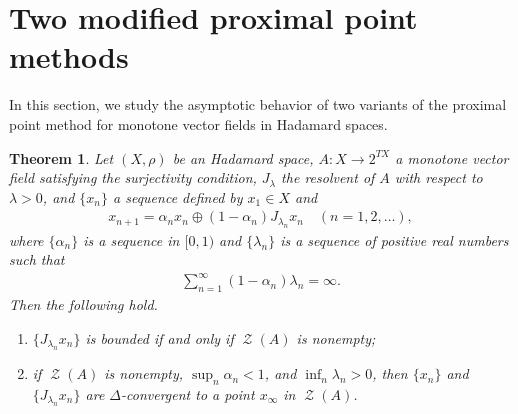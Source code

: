 \documentclass[draft]{amsart}
\numberwithin{equation}{section}
\DeclareMathOperator{\Zer}{\mathcal{Z}}
\theoremstyle{plain}
\newtheorem{theorem}{Theorem}[section]
\theoremstyle{definition}
\theoremstyle{remark}
\begin{document}
\section{Two modified proximal point methods}

In this section, we study the asymptotic behavior of 
two variants of the proximal point method for 
monotone vector fields in Hadamard spaces. 

\begin{theorem}\label{thm:MPPA-CAT0-Delta}
 Let $(X, \rho)$ be an Hadamard space, 
 $A\colon X\to 2^{TX}$ a monotone vector field 
 satisfying the surjectivity condition, 
 $J_{\lambda}$ the resolvent of $A$ with respect to 
 $\lambda>0$, and 
 $\{x_n\}$ a sequence defined by $x_1\in X$ and 
 \begin{align}\label{eq:MPPA-CAT0-Delta}
  x_{n+1} = \alpha_{n} x_n \oplus (1-\alpha_n) J_{\lambda_n}x_n 
  \quad (n=1,2,\dots), 
 \end{align}
 where $\{\alpha_n\}$ is a sequence in $[0,1)$ 
 and $\{\lambda_n\}$ is a sequence of positive real numbers such that 
 \begin{align*}
  \sum_{n=1}^{\infty}(1-\alpha_n)\lambda_n=\infty. 
 \end{align*}
 Then the following hold. 
 \begin{enumerate}
  \item[(i)] $\{J_{\lambda_n}x_n\}$ is bounded 
 if and only if $\Zer (A)$ is nonempty; 
  \item[(ii)] if $\Zer(A)$ is nonempty, $\sup_{n}\alpha_n <1$, and 
 $\inf_{n} \lambda_n >0$, then 
 $\{x_n\}$ and $\{J_{\lambda_n}x_n\}$ are $\Delta$-convergent to a point $x_{\infty}$ in $\Zer(A)$. 
 \end{enumerate}
\end{theorem}
\end{document}
